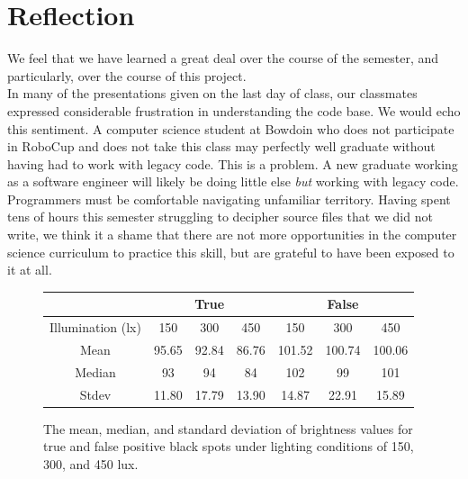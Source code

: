 \documentclass[11pt, twocolumn]{article}
\begin{document}
\section{Reflection}
We feel that we have learned a great deal over the course of the semester, and particularly, over the course of this project. \\
\indent In many of the presentations given on the last day of class, our classmates expressed considerable frustration in understanding the code base. We would echo this sentiment. A computer science student at Bowdoin who does not participate in RoboCup and does not take this class  may perfectly well graduate without having had to work with legacy code. This is a problem. A new graduate working as a software engineer will likely be doing little else \emph{but} working with legacy code. Programmers must be comfortable navigating unfamiliar territory. Having spent tens of hours this semester struggling to decipher source files that we did not write, we think it a shame that there are not more opportunities in the computer science curriculum to practice this skill, but are grateful to have been exposed to it at all. \\
\indent 
\onecolumn
\begin{figure}[h]
\label{fig:table}
\centering
\begin{tabular}{ccccccc}
\toprule
 & \multicolumn{3}{c}{True} & \multicolumn{3}{c}{False} \\
\midrule
Illumination (lx) & 150 & 300 & 450 & 150 & 300 & 450 \\
\midrule
Mean & 95.65 & 92.84 & 86.76 & 101.52 & 100.74 & 100.06 \\
Median & 93 & 94 & 84 & 102 & 99 & 101 \\
Stdev & 11.80 & 17.79 & 13.90 & 14.87 & 22.91 & 15.89 \\
\bottomrule
\end{tabular}
\caption{The mean, median, and standard deviation of brightness values for true and false positive black spots under lighting conditions of 150, 300, and 450 lux.}
\end{figure}
\end{document}
